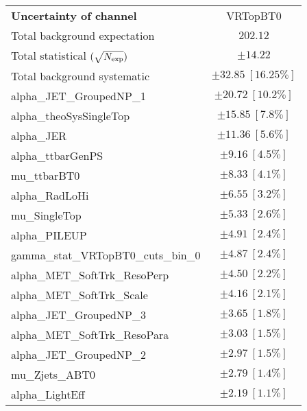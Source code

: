 
\begin{table}
\begin{center}
\setlength{\tabcolsep}{0.0pc}
\begin{tabular*}{\textwidth}{@{\extracolsep{\fill}}lc}
\noalign{\smallskip}\hline\noalign{\smallskip}
{\bf Uncertainty of channel}                                    & VRTopBT0            \\
\noalign{\smallskip}\hline\noalign{\smallskip}
Total background expectation             &  $202.12$       \\
\noalign{\smallskip}\hline\noalign{\smallskip}
Total statistical $(\sqrt{N_{\rm exp}})$              & $\pm 14.22$       \\
Total background systematic               & $\pm 32.85\ [16.25\%] $             \\
\noalign{\smallskip}\hline\noalign{\smallskip}
\noalign{\smallskip}\hline\noalign{\smallskip}
alpha\_JET\_GroupedNP\_1         & $\pm 20.72\ [10.2\%] $       \\
alpha\_theoSysSingleTop         & $\pm 15.85\ [7.8\%] $       \\
alpha\_JER         & $\pm 11.36\ [5.6\%] $       \\
alpha\_ttbarGenPS         & $\pm 9.16\ [4.5\%] $       \\
mu\_ttbarBT0         & $\pm 8.33\ [4.1\%] $       \\
alpha\_RadLoHi         & $\pm 6.55\ [3.2\%] $       \\
mu\_SingleTop         & $\pm 5.33\ [2.6\%] $       \\
alpha\_PILEUP         & $\pm 4.91\ [2.4\%] $       \\
gamma\_stat\_VRTopBT0\_cuts\_bin\_0         & $\pm 4.87\ [2.4\%] $       \\
alpha\_MET\_SoftTrk\_ResoPerp         & $\pm 4.50\ [2.2\%] $       \\
alpha\_MET\_SoftTrk\_Scale         & $\pm 4.16\ [2.1\%] $       \\
alpha\_JET\_GroupedNP\_3         & $\pm 3.65\ [1.8\%] $       \\
alpha\_MET\_SoftTrk\_ResoPara         & $\pm 3.03\ [1.5\%] $       \\
alpha\_JET\_GroupedNP\_2         & $\pm 2.97\ [1.5\%] $       \\
mu\_Zjets\_ABT0         & $\pm 2.79\ [1.4\%] $       \\
alpha\_LightEff         & $\pm 2.19\ [1.1\%] $       \\

\end{tabular*}
\end{center}
\end{table}
